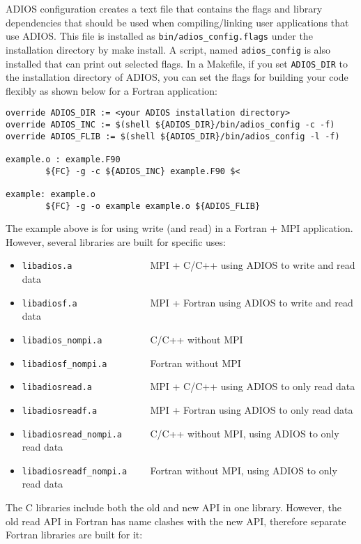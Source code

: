 ADIOS configuration creates a text file that contains the flags and library dependencies 
that should be used when compiling/linking user applications that use ADIOS. This 
file is installed as \verb+bin/adios_config.flags+ under the installation directory by 
make install. A script, named \verb+adios_config+ is also installed that can print out 
selected flags. In a Makefile, if you set \verb+ADIOS_DIR+ to the installation directory 
of ADIOS, you can set the flags for building your code flexibly as shown below 
for a Fortran application: 

\begin{lstlisting}
override ADIOS_DIR := <your ADIOS installation directory>
override ADIOS_INC := $(shell ${ADIOS_DIR}/bin/adios_config -c -f)
override ADIOS_FLIB := $(shell ${ADIOS_DIR}/bin/adios_config -l -f)

example.o : example.F90
        ${FC} -g -c ${ADIOS_INC} example.F90 $<

example: example.o
        ${FC} -g -o example example.o ${ADIOS_FLIB} 
\end{lstlisting}

The example above is for using write (and read) in a Fortran + MPI application. However, several libraries are built for specific uses:

\begin{itemize}
\item \verb+libadios.a               +   MPI + C/C++ using ADIOS to write and read data
\item \verb+libadiosf.a              +   MPI + Fortran using ADIOS to write and read data
\item \verb+libadios_nompi.a         +   C/C++ without MPI
\item \verb+libadiosf_nompi.a        +   Fortran without MPI
\item \verb+libadiosread.a           +   MPI + C/C++ using ADIOS to only read data
\item \verb+libadiosreadf.a          +   MPI + Fortran using ADIOS to only read data
\item \verb+libadiosread_nompi.a     +   C/C++ without MPI, using ADIOS to only read data
\item \verb+libadiosreadf_nompi.a    +   Fortran without MPI, using ADIOS to only read data
\end{itemize}

The C libraries include both the old and new API in one library. However, the old read API in Fortran has name clashes with the new API, therefore separate Fortran libraries are built for it: 

